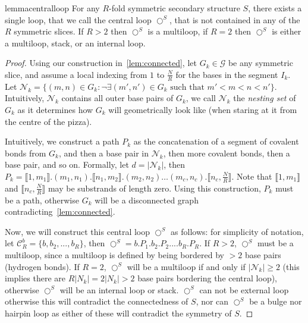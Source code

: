 \documentclass[11pt,letterpaper]{article}  \usepackage[margin=1in]{geometry}
\theoremstyle{definition}  \newtheorem{Definition}[theorem]{Definition}
\begin{document}
\begin{restatable}{lemma}{centralloop} 
	\label{lem:centralloop}
	For any $R$-fold symmetric secondary structure $S$, there exists a single loop, that we call the central loop $\bigcirc^S$, that is not contained in any of the $R$ symmetric slices. 
	If $R>2$ then $\bigcirc^S$ is a multiloop, if $R=2$ then $\bigcirc^S$ is either a multiloop, stack, or an internal loop.   
\end{restatable}
\begin{proof}
	Using our construction in~\cref{lem:connected}, 
	let   
	$G_k \in \mathcal{G}$ be any symmetric slice, and 
	assume a local indexing from $1$ to $\frac{N}{R}$ for the bases in the segment $I_k$. Let $\mathcal{N}_k = \{(m,n) \in G_k: \neg\exists (m',n') \in G_k \textrm{ such that } m'<m<n<n'\}$. Intuitively,  $\mathcal{N}_k$ contains all outer base pairs of $G_k$, we call  $\mathcal{N}_k$ the \emph{nesting set} of $G_k$ as it determines how $G_k$ will geometrically look like (when staring at it from the centre of the pizza). 
	
	Intuitively, we construct a path $P_k$ as the concatenation of a segment of covalent bonds from $G_k$, and then a base pair in $\mathcal{N}_k$, then more covalent bonds, then a base pair, and so on.  Formally, let $d = |\mathcal{N}_k|$, then  $P_k = \llbracket 1,m_1 \rrbracket. (m_1,n_1). \llbracket n_1,m_2 \rrbracket.  (m_2,n_2) \ldots (m_c,n_c). \llbracket n_c,\frac{N}{R} \rrbracket$. Note that $\llbracket 1,m_1 \rrbracket$ and $\llbracket n_c,\frac{N}{R} \rrbracket$ may be substrands of length zero. Using this construction, $P_k$ must be a path, otherwise $G_k$ will be a disconnected graph contradicting~\cref{lem:connected}.
	
	Now, we will construct this central loop $\bigcirc^S$ as follows: for simplicity of notation, let $\mathcal{C}_R^b = \{ b, b_2, ..., b_R\}$, then 
	$\bigcirc^S = b. P_1. b_2. P_2. ... b_R. P_R$. If $R > 2$, $\bigcirc^S$ must be a multiloop, since a multiloop is defined by being bordered by $>2$ base pairs (hydrogen bonds). 
	If $R = 2$, $\bigcirc^S$ will be a multiloop if and only if $|\mathcal{N}_k| \geq 2$ (this implies there are $R |N_k| = 2|N_k|  > 2 $ base pairs bordering the central loop), 
	otherwise $\bigcirc^S$ will be an internal loop or stack. $\bigcirc^S$ can not be external loop otherwise this will contradict the connectedness of $S$, nor can $\bigcirc^S$  be a bulge nor hairpin loop as either of these  will contradict the  symmetry of $S$. 
\end{proof}
\end{document}

